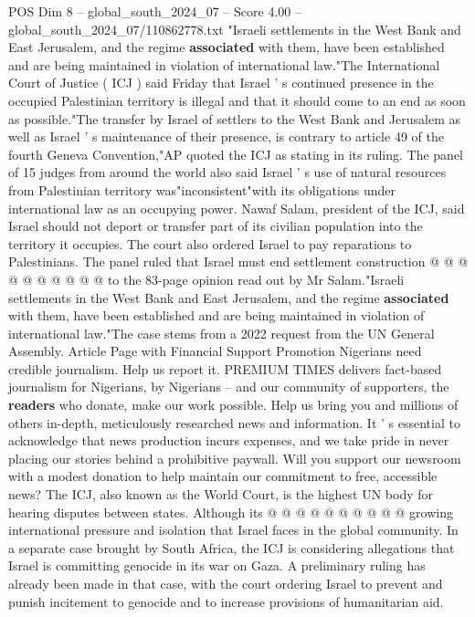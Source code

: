 \begin{textsample}{POS Dim 8 – global\_south\_2024\_07 – Score 4.00 – global\_south\_2024\_07/110862778.txt}  \label{ex:f8_pos_333}
"Israeli settlements in the West Bank and East Jerusalem, and the regime \textbf{associated} with them, have been established and are being maintained in violation of international law."The International Court of Justice ( ICJ ) said Friday that Israel ' s continued presence in the occupied Palestinian territory is illegal and that it should come to an end as soon as possible."The transfer by Israel of settlers to the West Bank and Jerusalem as well as Israel ' s maintenance of their presence, is contrary to article 49 of the fourth Geneva Convention,"AP quoted the ICJ as stating in its ruling.
The panel of 15 judges from around the world also said Israel ' s use of natural resources from Palestinian territory was"inconsistent"with its obligations under international law as an occupying power.
Nawaf Salam, president of the ICJ, said Israel should not deport or transfer part of its civilian population into the territory it occupies.
The court also ordered Israel to pay reparations to Palestinians.
The panel ruled that Israel must end settlement construction @ @ @ @ @ @ @ @ @ @ to the 83-page opinion read out by Mr Salam."Israeli settlements in the West Bank and East Jerusalem, and the regime \textbf{associated} with them, have been established and are being maintained in violation of international law."The case stems from a 2022 request from the UN General Assembly.
Article Page with Financial Support Promotion Nigerians need credible journalism.
Help us report it.
PREMIUM TIMES delivers fact-based journalism for Nigerians, by Nigerians -- and our community of supporters, the \textbf{readers} who donate, make our work possible.
Help us bring you and millions of others in-depth, meticulously researched news and information.
It ' s essential to acknowledge that news production incurs expenses, and we take pride in never placing our stories behind a prohibitive paywall.
Will you support our newsroom with a modest donation to help maintain our commitment to free, accessible news?
The ICJ, also known as the World Court, is the highest UN body for hearing disputes between states.
Although its @ @ @ @ @ @ @ @ @ @ growing international pressure and isolation that Israel faces in the global community.
In a separate case brought by South Africa, the ICJ is considering allegations that Israel is committing genocide in its war on Gaza.
A preliminary ruling has already been made in that case, with the court ordering Israel to prevent and punish incitement to genocide and to increase provisions of humanitarian aid.

\end{textsample}
